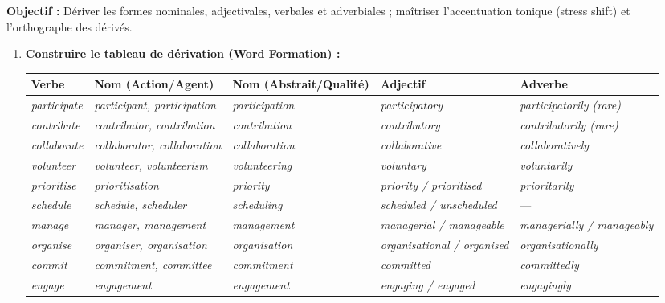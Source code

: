 \documentclass[11pt]{article}
\newcommand{\eng}[1]{\ifmmode\text{\textit{#1}}\else\begingroup\selectlanguage{english}\itshape #1\endgroup\fi}
\begin{document}
\begin{methode}
\textbf{Objectif :} Dériver les formes nominales, adjectivales, verbales et adverbiales ; maîtriser l'accentuation tonique (stress shift) et l'orthographe des dérivés.
\begin{enumerate}
    \item \textbf{Construire le tableau de dérivation (Word Formation) :}
    \begin{center}
    \begin{tabularx}{\linewidth}{|X|X|X|X|X|}\hline
    \rowcolor{popgreenL} \textbf{Verbe} & \textbf{Nom (Action/Agent)} & \textbf{Nom (Abstrait/Qualité)} & \textbf{Adjectif} & \textbf{Adverbe} \\ \hline
    \eng{participate} & \eng{participant, participation} & \eng{participation} & \eng{participatory} & \eng{participatorily} (rare) \\ \hline
    \eng{contribute} & \eng{contributor, contribution} & \eng{contribution} & \eng{contributory} & \eng{contributorily} (rare) \\ \hline
    \eng{collaborate} & \eng{collaborator, collaboration} & \eng{collaboration} & \eng{collaborative} & \eng{collaboratively} \\ \hline
    \eng{volunteer} & \eng{volunteer, volunteerism} & \eng{volunteering} & \eng{voluntary} & \eng{voluntarily} \\ \hline
    \eng{prioritise} & \eng{prioritisation} & \eng{priority} & \eng{priority / prioritised} & \eng{prioritarily} \\ \hline
    \eng{schedule} & \eng{schedule, scheduler} & \eng{scheduling} & \eng{scheduled / unscheduled} & --- \\ \hline
    \eng{manage} & \eng{manager, management} & \eng{management} & \eng{managerial / manageable} & \eng{managerially / manageably} \\ \hline
    \eng{organise} & \eng{organiser, organisation} & \eng{organisation} & \eng{organisational / organised} & \eng{organisationally} \\ \hline
    \eng{commit} & \eng{commitment, committee} & \eng{commitment} & \eng{committed} & \eng{committedly} \\ \hline
    \eng{engage} & \eng{engagement} & \eng{engagement} & \eng{engaging / engaged} & \eng{engagingly} \\ \hline
    \end{tabularx}
    \end{center}

\end{enumerate}
\end{methode}
\end{document}
